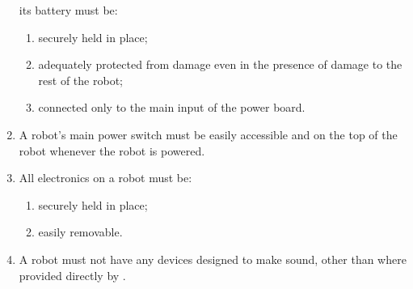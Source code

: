 \begin{enumerate}
      its battery must be:
  \begin{enumerate}
    \item securely held in place;
    \item adequately protected from damage even in the presence of damage to the
          rest of the robot;
    \item connected only to the main input of the power board.
  \end{enumerate}
\item A robot's main power switch must be easily accessible and on the top of
      the robot whenever the robot is powered.
\item All electronics on a robot must be:
  \begin{enumerate}
    \item securely held in place;
    \item easily removable.
  \end{enumerate}

\item A robot must not have any devices designed to make sound, other
      than where provided directly by \org{}.
\end{enumerate}

